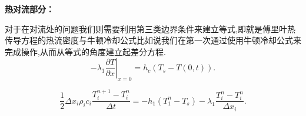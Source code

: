\documentclass{whutmod}
\begin{document}
\textbf{热对流部分：}

对于在对流处的问题我们则需要利用第三类边界条件来建立等式,即就是傅里叶热传导方程的热流密度与牛顿冷却公式比如说我们在第一次通过使用牛顿冷却公式来完成操作,从而从等式的角度建立起差分方程.
\begin{equation}
-\left.\lambda_{1} \frac{\partial T}{\partial x}\right|_{x=0}=h_{c}\left(T_{s}-T(0, t)\right).
\end{equation}

\begin{equation}
\frac{1}{2} \Delta x_{i} \rho_{i} c_{i} \frac{T_{i}^{n+1}-T_{i}^{n}}{\Delta t}=-h_{1}\left(T_{1}^{n}-T_{s}\right)-\lambda_{1} \frac{T_{i}^{n}-T_{i}^{n}}{\Delta x_{i}}.
\end{equation}


%
%	




\end{document}
